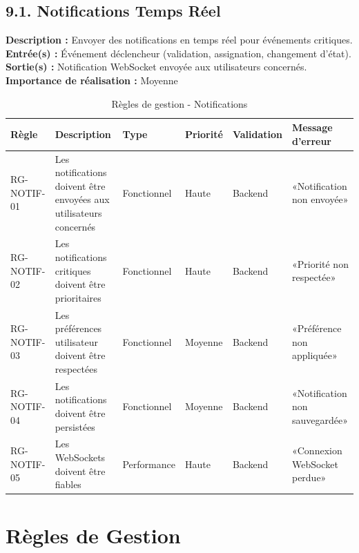 \subsection{9.1. Notifications Temps Réel}
\textbf{Description :} Envoyer des notifications en temps réel pour événements critiques.
\textbf{Entrée(s) :} Événement déclencheur (validation, assignation, changement d'état).
\textbf{Sortie(s) :} Notification WebSocket envoyée aux utilisateurs concernés.
\textbf{Importance de réalisation :} Moyenne

\begin{table}[H]
\centering
\footnotesize
\begin{tabular}{|p{1.5cm}|p{3.5cm}|p{1.5cm}|p{1.5cm}|p{2cm}|p{2.5cm}|}
\hline
\textbf{Règle} & \textbf{Description} & \textbf{Type} & \textbf{Priorité} & \textbf{Validation} & \textbf{Message d'erreur} \\
\hline
RG-NOTIF-01 & Les notifications doivent être envoyées aux utilisateurs concernés & Fonctionnel & Haute & Backend & «Notification non envoyée» \\
\hline
RG-NOTIF-02 & Les notifications critiques doivent être prioritaires & Fonctionnel & Haute & Backend & «Priorité non respectée» \\
\hline
RG-NOTIF-03 & Les préférences utilisateur doivent être respectées & Fonctionnel & Moyenne & Backend & «Préférence non appliquée» \\
\hline
RG-NOTIF-04 & Les notifications doivent être persistées & Fonctionnel & Moyenne & Backend & «Notification non sauvegardée» \\
\hline
RG-NOTIF-05 & Les WebSockets doivent être fiables & Performance & Haute & Backend & «Connexion WebSocket perdue» \\
\hline
\end{tabular}
\caption{Règles de gestion - Notifications}
\label{tab:rg_notifications}
\end{table}

\section{Règles de Gestion}

